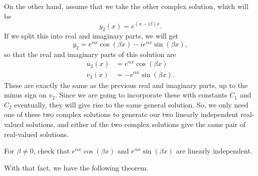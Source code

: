 On the other hand, assume that we take the other complex solution, which will be  
\begin{equation*}
y_2(x) = e^{(\alpha - i\beta) x}.
\end{equation*}
If we split this into real and imaginary parts, we will get 
\begin{equation*}
y_2  = e^{\alpha x} \cos (\beta x) - i e^{\alpha x} \sin (\beta x),
\end{equation*}
so that the real and imaginary parts of this solution are
\begin{equation*}
\begin{split}
u_2(x) &= e^{\alpha x} \cos (\beta x) \\
v_2(x) &= -e^{\alpha x} \sin (\beta x).
\end{split}
\end{equation*}
These are exactly the same as the previous real and imaginary parts, up to the minus sign on $v_2$. Since we are going to incorporate these with constants $C_1$ and $C_2$ eventually, they will give rise to the same general solution. So, we only need one of these two complex solutions to generate our two linearly independent real-valued solutions, and either of the two complex solutions give the same pair of real-valued solutions.

\begin{exercise}
For $\beta \neq 0$, check that $e^{\alpha x} \cos (\beta x)$ and $e^{\alpha x} \sin (\beta x)$ are linearly independent.
\end{exercise}

With that fact, we have the following theorem. 

%
%

